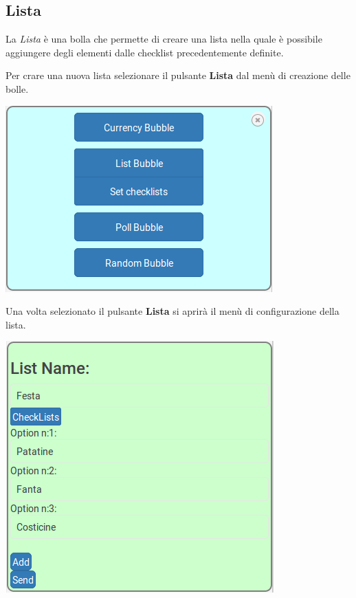 \subsection{Lista}
\begin{flushleft}
La \textit{Lista} è una bolla che permette di creare una lista nella quale è possibile aggiungere degli elementi dalle checklist precedentemente definite.

Per crare una nuova lista selezionare il pulsante \textbf{Lista} dal menù di creazione delle bolle.\\
\begin{center}
\includegraphics[scale=0.75]{img/menu.png}
\end{center}

Una volta selezionato il pulsante \textbf{Lista} si aprirà il menù di configurazione della lista.\\
\begin{center}
\includegraphics[scale=0.75]{img/list_conf.png}
\end{center}


\end{flushleft}
